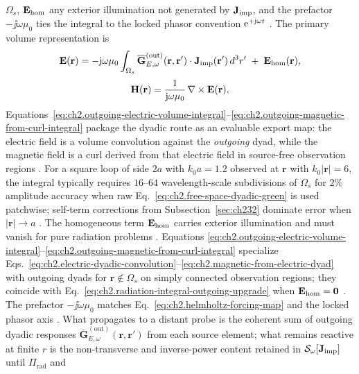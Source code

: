 $\Omega_s$, $\mathbf{E}_{\mathrm{hom}}$ any exterior illumination not generated by $\mathbf{J}_{\mathrm{imp}}$, and the
prefactor $-\jj\omega\mu_0$ ties the integral to the locked phasor convention
$\mathrm{e}^{+\mathrm{j}\omega t}$ \cite{stratton1941}. The primary volume representation is
\begin{equation}
\label{eq:ch2.outgoing-electric-volume-integral}
\mathbf{E}(\mathbf{r})
=
-\mathrm{j}\omega\mu_0
\int_{\Omega_s}
\overline{\mathbf{G}}_{E,\omega}^{\mathrm{(out)}}(\mathbf{r},\mathbf{r}')\cdot\mathbf{J}_{\mathrm{imp}}(\mathbf{r}')\,d^{3}r'
\;+\;\mathbf{E}_{\mathrm{hom}}(\mathbf{r}),
\end{equation}
\begin{equation}
\label{eq:ch2.outgoing-magnetic-from-curl-integral}
\mathbf{H}(\mathbf{r})
=
\frac{1}{\mathrm{j}\omega\mu_0}\,\nabla\times\mathbf{E}(\mathbf{r}),
\end{equation}
Equations~\eqref{eq:ch2.outgoing-electric-volume-integral}--\eqref{eq:ch2.outgoing-magnetic-from-curl-integral}
package the dyadic route as an evaluable export map: the electric field is a volume
convolution against the \emph{outgoing} dyad, while the magnetic field is a curl derived
from that electric field in source-free observation regions \cite{stratton1941}. For a
square loop of side \(2a\) with \(k_0 a=1.2\) observed at \(\mathbf{r}\) with
\(k_0|\mathbf{r}|=6\), the integral typically requires \(16\)--\(64\) wavelength-scale
subdivisions of \(\Omega_s\) for \(2\%\) amplitude accuracy when raw
Eq.~\eqref{eq:ch2.free-space-dyadic-green} is used patchwise; self-term corrections from
Subsection~\ref{sec:ch232} dominate error when \(|\mathbf{r}|\to a\)
\cite{harrington2001}. The homogeneous term \(\mathbf{E}_{\mathrm{hom}}\) carries exterior
illumination and must vanish for pure radiation problems \cite{stratton1941}. Equations
\eqref{eq:ch2.outgoing-electric-volume-integral}--\eqref{eq:ch2.outgoing-magnetic-from-curl-integral}
specialize Eqs.~\eqref{eq:ch2.electric-dyadic-convolution}--\eqref{eq:ch2.magnetic-from-electric-dyad}
with outgoing dyads for \(\mathbf{r}\notin\Omega_s\) on simply connected observation
regions; they coincide with Eq.~\eqref{eq:ch2.radiation-integral-outgoing-upgrade} when
\(\mathbf{E}_{\mathrm{hom}}=\mathbf{0}\) \cite{stratton1941}. The prefactor
\(-\jj\omega\mu_0\) matches Eq.~\eqref{eq:ch2.helmholtz-forcing-map} and the locked
phasor axis \cite{stratton1941}. What propagates to a distant probe is the coherent sum of
outgoing dyadic responses $\overline{\mathbf{G}}_{E,\omega}^{\mathrm{(out)}}(\mathbf{r},\mathbf{r}')$
from each source element; what remains reactive at finite $r$ is the non-transverse and
inverse-power content retained in $\mathcal{S}_\omega[\mathbf{J}_{\mathrm{imp}}]$ until $\Pi_{\mathrm{rad}}$ and
